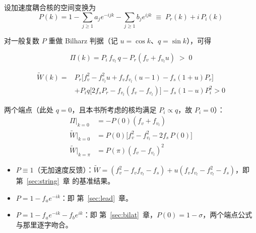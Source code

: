 \documentclass[11pt,a4paper,openany]{book}
\numberwithin{equation}{chapter}
\numberwithin{figure}{chapter}
\numberwithin{table}{chapter}
\begin{document}
设加速度耦合核的空间变换为
\begin{equation}
P(k) = 1 - \sum_{j\ge1}a_j e^{-ijk} - \sum_{j\ge1}b_j e^{ijk} \;\equiv\; P_r(k) + i\,P_i(k)
\end{equation}

对一般复数 $P$ 重做 Bilharz 判据（记 $u=\cos k$、$q=\sin k$），可得

\begin{tcolorbox}[keybox,title=\textbf{条件 I}]
\begin{equation}
\Pi(k) = P_i\,f_{v_l}\,q - P_r\left(f_v + f_{v_l}u\right) \;>\; 0
\end{equation}
\end{tcolorbox}

\begin{tcolorbox}[keybox,title=\textbf{条件 II}]
\begin{equation}
\begin{aligned}
\widetilde W(k)={}&P_r\Big[f_v^2-f_{v_l}^2u+f_vf_{v_l}(u-1)-f_s(1+u)P_r\Big]\\
&+P_i q\Big[2f_sP_r-f_{v_l}(f_v-f_{v_l})\Big]
-f_s(1-u)P_i^2>0
\end{aligned}
\end{equation}
\end{tcolorbox}

两个端点（此处 $q=0$，且本书所考虑的核均满足 $P_i\propto q$，故 $P_i=0$）：
\begin{align}
\Pi\big|_{k=0} &= -P(0)\left(f_v+f_{v_l}\right) \\
\widetilde W\big|_{k=0} &= P(0)\Big[f_v^2 - f_{v_l}^2 - 2f_s\,P(0)\Big]
\label{eq:Wend}\\
\widetilde W\big|_{k=\pi} &= P(\pi)\left(f_v-f_{v_l}\right)^2
\end{align}

\begin{tcolorbox}[notebox,title=\textbf{向下兼容检验}]
\begin{itemize}[leftmargin=1.2em,itemsep=2pt]
\item $P\equiv1$（无加速度反馈）：$\widetilde W = \left(f_v^2-f_vf_{v_l}-f_s\right)+u\left(f_vf_{v_l}-f_{v_l}^2-f_s\right)$，即 第~\ref{sec:string}~章 的基准结果。
\item $P=1-f_ae^{-ik}$：即 第~\ref{sec:lead}~章。
\item $P=1-f_ae^{-ik}-f_be^{ik}$：即 第~\ref{sec:bilat}~章，$P(0)=1-\sigma$，两个端点公式与那里逐字吻合。
\end{itemize}
\end{tcolorbox}
\end{document}
